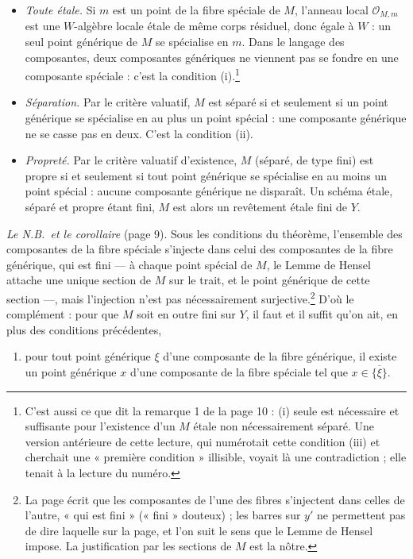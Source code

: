 \documentclass[11pt,a4paper]{article}
\begin{document}
\begin{itemize}
\item \emph{Toute étale.} Si $m$ est un point de la fibre spéciale de $M$,
l'anneau local $\mathcal{O}_{M,m}$ est une $W$-algèbre locale étale de même
corps résiduel, donc égale à $W$ : un seul point générique de $M$ se spécialise
en $m$. Dans le langage des composantes, deux composantes génériques ne
viennent pas se fondre en une composante spéciale : c'est la condition
(i).\footnote{C'est aussi ce que dit la remarque 1 de la page 10 : (i) seule
est nécessaire et suffisante pour l'existence d'un $M$ étale non
nécessairement séparé. Une version antérieure de cette lecture, qui
numérotait cette condition (iii) et cherchait une « première condition »
illisible, voyait là une contradiction ; elle tenait à la lecture du numéro.}
\item \emph{Séparation.} Par le critère valuatif, $M$ est séparé si et seulement
si un point générique se spécialise en au plus un point spécial : une
composante générique ne se casse pas en deux. C'est la condition (ii).
\item \emph{Propreté.} Par le critère valuatif d'existence, $M$ (séparé, de
type fini) est propre si et seulement si tout point générique se spécialise en
au moins un point spécial : aucune composante générique ne disparaît. Un
schéma étale, séparé et propre étant fini, $M$ est alors un revêtement étale
fini de $Y$.
\end{itemize}

\emph{Le N.B.\ et le corollaire} (page 9). Sous les conditions du théorème,
l'ensemble des composantes de la fibre spéciale s'injecte dans celui des
composantes de la fibre générique, qui est fini --- à chaque point spécial de
$M$, le Lemme de Hensel attache une unique section de $M$ sur le trait, et le
point générique de cette section ---, mais l'injection n'est pas
nécessairement surjective.\footnote{La page écrit que les composantes de l'une
des fibres s'injectent dans celles de l'autre, « qui est fini » (« fini »
douteux) ; les barres sur $y'$ ne permettent pas de dire laquelle sur la page,
et l'on suit le sens que le Lemme de Hensel impose. La justification par les
sections de $M$ est la nôtre.} D'où le complément : pour que $M$ soit en outre
fini sur $Y$, il faut et il suffit qu'on ait, en plus des conditions
précédentes,

\begin{enumerate}
\item[(iii)] pour tout point générique $\xi$ d'une composante de la fibre
générique, il existe un point générique $x$ d'une composante de la fibre
spéciale tel que $x \in \overline{\{\xi\}}$.
\end{enumerate}
\end{document}
